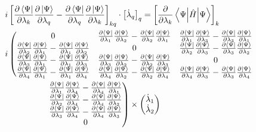\documentclass{aux/ttuthes2007}
\newcommand{\bra}[1]{\ensuremath{\left\langle#1\right\vert}}
\newcommand{\ket}[1]{\ensuremath{\left|#1\right\rangle}}
\newcommand{\sandwich}[3]{\left< #1 \middle\vert #2 \middle\vert #3 \right>}
\newcommand{\pd}[1]{\frac{\partial}{\partial #1}}
\newcommand{\kpp}[1]{\frac{\partial \ket\Psi}{\partial #1}}
\newcommand{\bpp}[1]{\frac{\partial \bra\Psi}{\partial #1}}
\begin{document}
\begin{equation}
	\begin{split}
		\label{eq:matrixderiv}
		&i \left [ \bpp{\lambda_k} \kpp{\lambda_q} 
			- \bpp{\lambda_q} \kpp{\lambda_k} \right ]_{kq}
		\cdot 	\left[ \dot \lambda_q \right]_q
		=	\left[\pd{\lambda_k}\sandwich{\Psi}{\hat H}{\Psi}\right]_k 
	\\%
		\span i
		\left(
		\begin{matrix}
			0 
			&  \bpp{\lambda_1} \kpp{\lambda_2} -  \bpp{\lambda_2} \kpp{\lambda_1} 
			&  \bpp{\lambda_1} \kpp{\lambda_3} -  \bpp{\lambda_3} \kpp{\lambda_1} 
		\\%
			 \bpp{\lambda_2} \kpp{\lambda_1} -  \bpp{\lambda_1} \kpp{\lambda_2} 
			& 0
			& \bpp{\lambda_2} \kpp{\lambda_3} -  \bpp{\lambda_3} \kpp{\lambda_2} 
		\\%
			 \bpp{\lambda_3} \kpp{\lambda_1} -  \bpp{\lambda_1} \kpp{\lambda_3} 
			& \bpp{\lambda_3} \kpp{\lambda_2} -  \bpp{\lambda_2} \kpp{\lambda_3} 
			& 0
		\\%
			 \bpp{\lambda_4} \kpp{\lambda_1} -  \bpp{\lambda_1} \kpp{\lambda_4} 
			& \bpp{\lambda_4} \kpp{\lambda_2} -  \bpp{\lambda_2} \kpp{\lambda_4} 
			& \bpp{\lambda_4} \kpp{\lambda_3} -  \bpp{\lambda_3} \kpp{\lambda_4} 
		\end{matrix} 
		\right.
	\\
		&\qquad \qquad
	\left .
		\begin{matrix}
			&  \bpp{\lambda_1} \kpp{\lambda_4} -  \bpp{\lambda_4} \kpp{\lambda_1} 
		\\%
			& \bpp{\lambda_2} \kpp{\lambda_4} -  \bpp{\lambda_4} \kpp{\lambda_2} 
		\\%
			& \bpp{\lambda_3} \kpp{\lambda_4} -  \bpp{\lambda_4} \kpp{\lambda_3} 
		\\%
			& 0
		\end{matrix}
	\right )
		\times
		\begin{pmatrix}
			\dot \lambda_1 \\
			\dot \lambda_2 \\

\end{pmatrix}
\end{split}
\end{equation}
\end{document}
